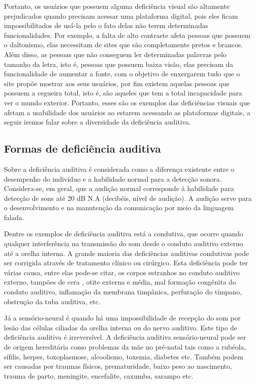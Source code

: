 \documentclass[a4paper]{article}
\begin{document}
\begin{titlepage}
Portanto, os usuários que possuem alguma deficiência visual são altamente prejudicados quando precisam acessar uma plataforma digital, pois eles ficam impossibilitados de usá-la pelo o fato delas não terem determinadas funcionalidades. Por exemplo, a falta de alto contraste afeta pessoas que possuem o daltonismo, elas necessitam de sites que são completamente pretos e brancos. Além disso, as pessoas que não conseguem ler determinadas palavras pelo tamanho da letra, isto é, pessoas que possuem baixa visão, elas precisam da funcionalidade de aumentar a fonte, com o objetivo de enxergarem tudo que o site propõe mostrar aos seus usuários, por fim existem aquelas pessoas que possuem a cegueira total, isto é, são aqueles que tem a total incapacidade para ver o mundo exterior. Portanto, esses são os exemplos das deficiências visuais que afetam a usabilidade dos usuários ao estarem acessando as plataformas digitais, a seguir iremos falar sobre a diversidade da deficiência auditiva.

\subsection{Formas de deficiência auditiva}
Sobre a deficiência auditiva é considerada como a diferença existente entre o desempenho do indivíduo e a habilidade normal para a detecção sonora. Considera-se, em geral, que a audição normal corresponde à habilidade para detecção de sons até 20 dB N.A (decibéis, nível de audição). A audição serve para o desenvolvimento e na manutenção da comunicação por meio da linguagem falada.

Dentre os exemplos de deficiência auditiva está a condutiva, que ocorre quando qualquer interferência na transmissão do som desde o conduto auditivo externo até a orelha interna. A grande maioria das deficiências auditivas condutivas pode ser corrigida através de tratamento clínico ou cirúrgico. Esta deficiência pode ter várias causa, entre elas pode-se citar, os corpos estranhos no conduto auditivo externo, tampões de cera , otite externa e média, mal formação congênita do conduto auditivo, inflamação da membrana timpânica, perfuração do tímpano, obstrução da tuba auditiva, etc.

Já a sensório-neural é quando há uma impossibilidade de recepção do som por lesão das células ciliadas da orelha interna ou do nervo auditivo. Este tipo de deficiência auditiva é irreversível. A deficiência auditiva sensório-neural pode ser de origem hereditária como problemas da mãe no pré-natal tais como a rubéola, sífilis, herpes, toxoplasmose, alcoolismo, toxemia, diabetes etc. Também podem ser causadas por traumas físicos, prematuridade, baixo peso ao nascimento, trauma de parto, meningite, encefalite, caxumba, sarampo etc.


\end{titlepage}
\end{document}
